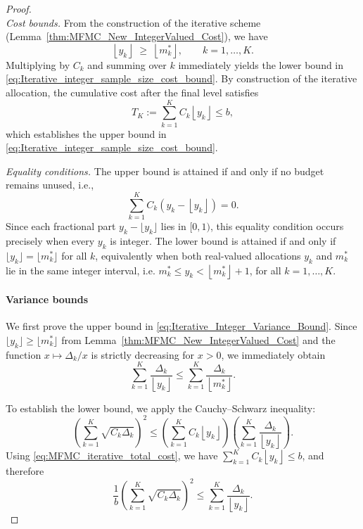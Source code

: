 \begin{proof}
\medskip
\noindent
\mbox{}\\
{\it Cost bounds.}
From the construction of the iterative scheme (Lemma~\ref{thm:MFMC_New_IntegerValued_Cost}), we have
\[
\left\lfloor y_k \right\rfloor \;\ge\; \left\lfloor m_k^* \right\rfloor,
\qquad k=1,\dots,K.
\]
Multiplying by $C_k$ and summing over $k$ immediately yields the lower bound in \eqref{eq:Iterative_integer_sample_size_cost_bound}. By construction of the iterative allocation, the cumulative cost after the final level satisfies
\begin{equation}\label{eq:MFMC_iterative_total_cost}
T_K
:=
\sum_{k=1}^K C_k \left\lfloor y_k \right\rfloor
\le b,
\end{equation}
which establishes the upper bound in \eqref{eq:Iterative_integer_sample_size_cost_bound}.


\medskip
\noindent
\textit{Equality conditions.}
The upper bound is attained if and only if no budget remains unused, i.e.,
\[
\sum_{k=1}^K C_k
\left(y_k - \left\lfloor y_k \right\rfloor\right) = 0.
\]
Since each fractional part $y_k - \lfloor y_k \rfloor $ lies in $[0,1)$, this equality condition occurs precisely when every $y_k$ is integer.  
The lower bound is attained if and only if \(\lfloor y_k \rfloor = \lfloor m_k^* \rfloor\) for all \(k\), equivalently when both real-valued allocations \(y_k\) and \(m_k^*\) lie in the same integer interval, i.e. $
m_k^* \le y_k < \left\lfloor m_k^* \right\rfloor + 1$, for all $k=1,\dots,K.$

\bigskip
\paragraph{Variance bounds}
We first prove the upper bound in \eqref{eq:Iterative_Integer_Variance_Bound}.  
Since $\lfloor y_k \rfloor \ge \lfloor m_k^* \rfloor$ from Lemma~\ref{thm:MFMC_New_IntegerValued_Cost} and the function
$x \mapsto \Delta_k/x$ is strictly decreasing for $x>0$, we immediately obtain
%
\[
\sum_{k=1}^K
\frac{\Delta_k}{\left\lfloor y_k \right\rfloor}
\le
\sum_{k=1}^K
\frac{\Delta_k}{\left\lfloor m_k^* \right\rfloor}.
\]

To establish the lower bound, we apply the Cauchy--Schwarz inequality:
\[
\left(\sum_{k=1}^K \sqrt{C_k \Delta_k}\right)^2
\le
\left(\sum_{k=1}^K C_k \left\lfloor y_k \right\rfloor\right)
\left(\sum_{k=1}^K \frac{\Delta_k}{\left\lfloor y_k \right\rfloor}\right).
\]
Using \eqref{eq:MFMC_iterative_total_cost}, we have $\sum_{k=1}^K C_k \left\lfloor y_k \right\rfloor \le b$, and therefore
\[
\frac{1}{b}
\left(\sum_{k=1}^K \sqrt{C_k \Delta_k}\right)^2
\le
\sum_{k=1}^K
\frac{\Delta_k}{\left\lfloor y_k \right\rfloor}.
\]


\end{proof}
